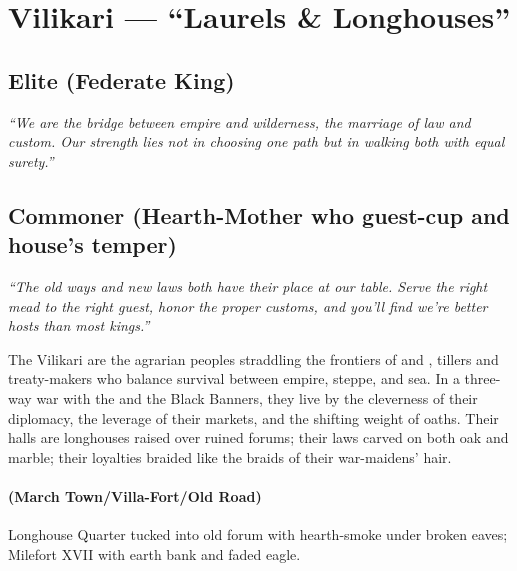 \section{Vilikari --- ``Laurels \& Longhouses''}
\label{chap:vilikari}

\subsection*{Elite (Federate King)}
\textit{``We are the bridge between empire and wilderness, the marriage of law and custom. Our strength lies not in choosing one path but in walking both with equal surety.''}

\subsection*{Commoner (Hearth-Mother who guest-cup and house's temper)}
\textit{``The old ways and new laws both have their place at our table. Serve the right mead to the right guest, honor the proper customs, and you'll find we're better hosts than most kings.''}

\begin{tcolorbox}[colback=black!3,colframe=black!40!white,title={Theme \& Atmosphere}]
The Vilikari are the agrarian peoples straddling the frontiers of  and , tillers and treaty-makers who balance survival between empire, steppe, and sea. In a three-way war with the  and the Black Banners, they live by the cleverness of their diplomacy, the leverage of their markets, and the shifting weight of oaths. Their halls are longhouses raised over ruined forums; their laws carved on both oak and marble; their loyalties braided like the braids of their war-maidens' hair.
\end{tcolorbox}

\paragraph*{(March Town/Villa-Fort/Old Road)} Longhouse Quarter tucked into old forum with hearth-smoke under broken eaves; Milefort XVII with earth bank and faded eagle.

